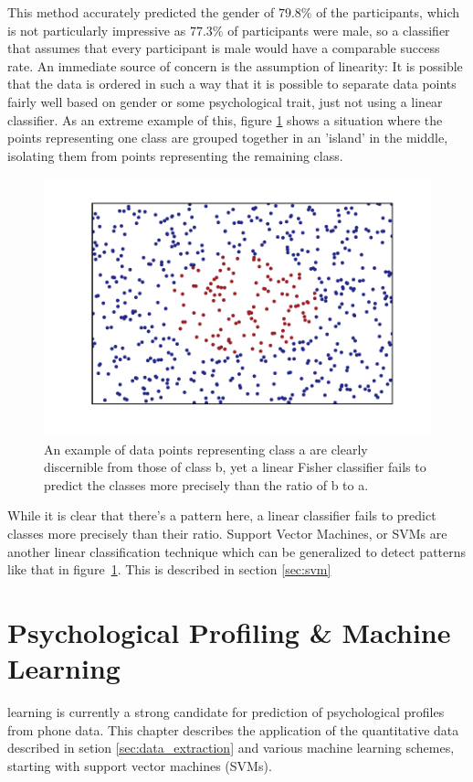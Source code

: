 This method accurately predicted the gender of $79.8\%$ of the participants, which is not particularly impressive as $77.3\%$ of participants were male, so a classifier that assumes that every participant is male would have a comparable success rate. An immediate source of concern is the assumption of linearity: It is possible that the data is ordered in such a way that it is possible to separate data points fairly well based on gender or some psychological trait, just not using a linear classifier. As an extreme example of this, figure \ref{fig:island_example} shows a situation where the points representing one class are grouped together in an 'island' in the middle, isolating them from points representing the remaining class.
\begin{figure}
	\centering
	\includegraphics[width = \figwidth]{pics/ml/island_example.pdf}
	\caption{An example of data points representing {\color{moerkeroed} class a} are clearly discernible from those of {\color{oldhat} class b}, yet a linear Fisher classifier fails to predict the classes more precisely than the ratio of {\color{oldhat} b} to {\color{moerkeroed} a}.}
	\label{fig:island_example}
\end{figure}
While it is clear that there's a pattern here, a linear classifier fails to predict classes more precisely than their ratio. Support Vector Machines, or SVMs are another linear classification technique which can be generalized to detect patterns like that in figure~\ref{fig:island_example}. This is described in section \ref{sec:svm}

\chapter[Psychological Profiling]{Psychological Profiling \& Machine Learning}
\label{sec:profiling}
 learning is currently a strong candidate for prediction of psychological profiles from phone data. This chapter describes the application of the quantitative data described in setion \ref{sec:data_extraction} and various machine learning schemes, starting with support vector machines (SVMs). 


